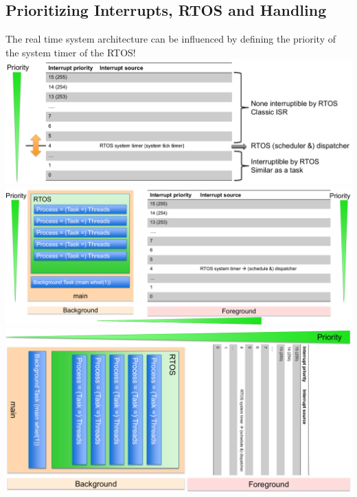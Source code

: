 \subsection{Prioritizing Interrupts, RTOS and Handling}
The real time system architecture can be influenced by defining the priority of the system timer of the RTOS!
\includegraphics[width=\textwidth]{images/DesignStrategy/prio_interrupts.png}
\includegraphics[width=\textwidth]{images/DesignStrategy/prio_interrupts_rtos_handling.png}
\includegraphics[width=\textwidth]{images/DesignStrategy/prio_interrupts_rtos_background.png}

